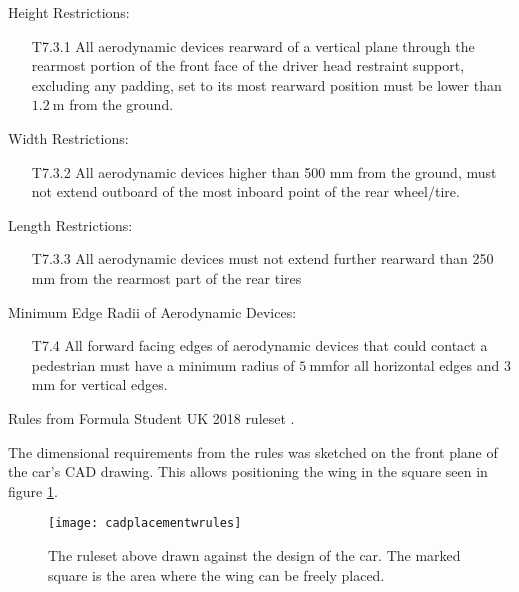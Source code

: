     \begin{tcolorbox}[colframe=seapurple,colback=seapurple!1]
      Height Restrictions:
      \begin{itemize}
        \item[T7.3.1] All aerodynamic devices rearward of a vertical plane through the rearmost portion of the front face of the driver head restraint support, excluding any padding, set to its most rearward position must be lower than $\SI{1.2}{\metre}$ from the ground.
      \end{itemize}

      Width Restrictions:
      \begin{itemize}
       \item [T7.3.2] All aerodynamic devices higher than 500 mm from the ground, must not extend outboard of the most inboard point of the rear wheel/tire.
      \end{itemize}

      Length Restrictions:
      \begin{itemize}
        \item [T7.3.3] All aerodynamic devices must not extend further rearward than 250 mm from the rearmost part of the rear tires
      \end{itemize}

      Minimum Edge Radii of Aerodynamic Devices:
      \begin{itemize}
        \item[T7.4\hphantom{.0}] All forward facing edges of aerodynamic devices that could contact a pedestrian must have a
      minimum radius of $\SI{5}{\milli\metre}$for all horizontal edges and 3 mm for vertical edges.
      \end{itemize}
      \vspace{5pt}
      \hspace*{\fill}\tiny{Rules from Formula Student UK 2018 ruleset \cite{FSrules18}.}
    \end{tcolorbox}

    The dimensional requirements from the rules was sketched on the front plane of the car's CAD drawing. This allows positioning the wing in the square seen in figure \ref{fig:cadplacement}.

    \begin{figure}
      \texttt{[image: cadplacementwrules]}
      \caption{The ruleset above drawn against the design of the car. The marked square is the area where the wing can be freely placed.}
      \label{fig:cadplacement}
    \end{figure}

